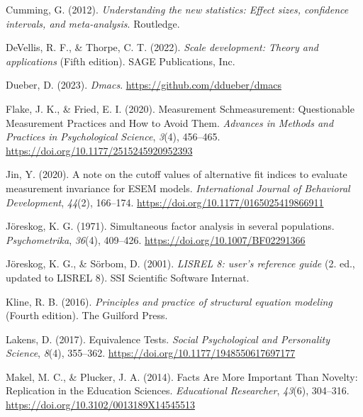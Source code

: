 \documentclass[
  man]{apa7}
\newlength{\cslhangindent}
\newlength{\cslentryspacingunit} %
\newenvironment{CSLReferences}[2] %
 {%
  \setlength{\parindent}{0pt}
  \ifodd #1
  \let\oldpar\par
  \def\par{\hangindent=\cslhangindent\oldpar}
  \fi
  \setlength{\parskip}{#2\cslentryspacingunit}
 }%
 {}
\begin{document}
\begin{CSLReferences}{1}{0}
\leavevmode{}%
Cumming, G. (2012). \emph{Understanding the new statistics: Effect sizes, confidence intervals, and meta-analysis}. Routledge.

\leavevmode{}%
DeVellis, R. F., \& Thorpe, C. T. (2022). \emph{Scale development: Theory and applications} (Fifth edition). SAGE Publications, Inc.

\leavevmode{}%
Dueber, D. (2023). \emph{Dmacs}. \url{https://github.com/ddueber/dmacs}

\leavevmode{}%
Flake, J. K., \& Fried, E. I. (2020). Measurement Schmeasurement: Questionable Measurement Practices and How to Avoid Them. \emph{Advances in Methods and Practices in Psychological Science}, \emph{3}(4), 456--465. \url{https://doi.org/10.1177/2515245920952393}

\leavevmode{}%
Jin, Y. (2020). A note on the cutoff values of alternative fit indices to evaluate measurement invariance for ESEM models. \emph{International Journal of Behavioral Development}, \emph{44}(2), 166--174. \url{https://doi.org/10.1177/0165025419866911}

\leavevmode{}%
Jöreskog, K. G. (1971). Simultaneous factor analysis in several populations. \emph{Psychometrika}, \emph{36}(4), 409--426. \url{https://doi.org/10.1007/BF02291366}

\leavevmode{}%
Jöreskog, K. G., \& Sörbom, D. (2001). \emph{LISREL 8: user's reference guide} (2. ed., updated to LISREL 8). SSI Scientific Software Internat.

\leavevmode{}%
Kline, R. B. (2016). \emph{Principles and practice of structural equation modeling} (Fourth edition). The Guilford Press.

\leavevmode{}%
Lakens, D. (2017). Equivalence Tests. \emph{Social Psychological and Personality Science}, \emph{8}(4), 355--362. \url{https://doi.org/10.1177/1948550617697177}

\leavevmode{}%
Makel, M. C., \& Plucker, J. A. (2014). Facts Are More Important Than Novelty: Replication in the Education Sciences. \emph{Educational Researcher}, \emph{43}(6), 304--316. \url{https://doi.org/10.3102/0013189X14545513}


\end{CSLReferences}
\end{document}
